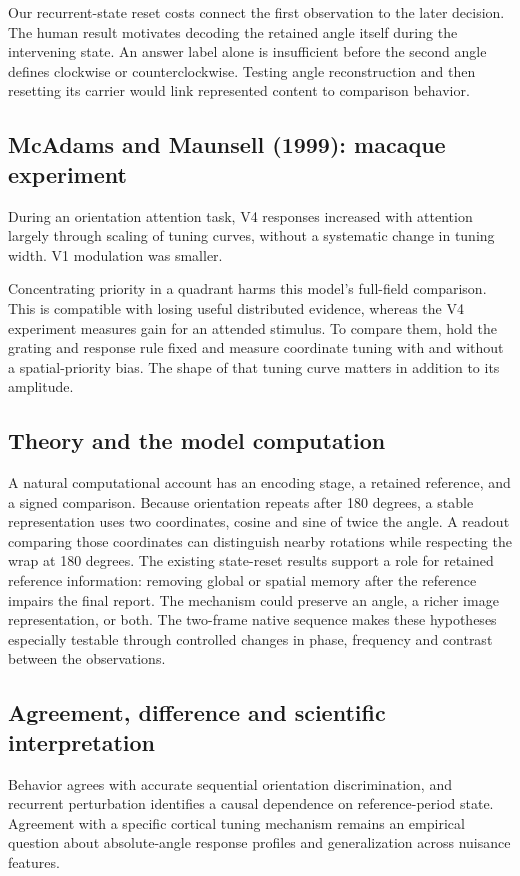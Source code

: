 \documentclass[11pt]{article}
\begin{document}
Our recurrent-state reset costs connect the first observation to the later decision. The human result motivates decoding the retained angle itself during the intervening state. An answer label alone is insufficient before the second angle defines clockwise or counterclockwise. Testing angle reconstruction and then resetting its carrier would link represented content to comparison behavior.

\subsection{McAdams and Maunsell (1999): macaque experiment}
During an orientation attention task, V4 responses increased with attention largely through scaling of tuning curves, without a systematic change in tuning width. V1 modulation was smaller. \cite{bio_mcadams}

Concentrating priority in a quadrant harms this model’s full-field comparison. This is compatible with losing useful distributed evidence, whereas the V4 experiment measures gain for an attended stimulus. To compare them, hold the grating and response rule fixed and measure coordinate tuning with and without a spatial-priority bias. The shape of that tuning curve matters in addition to its amplitude.

\subsection{Theory and the model computation}
A natural computational account has an encoding stage, a retained reference, and a signed comparison. Because orientation repeats after 180 degrees, a stable representation uses two coordinates, cosine and sine of twice the angle. A readout comparing those coordinates can distinguish nearby rotations while respecting the wrap at 180 degrees. The existing state-reset results support a role for retained reference information: removing global or spatial memory after the reference impairs the final report. The mechanism could preserve an angle, a richer image representation, or both. The two-frame native sequence makes these hypotheses especially testable through controlled changes in phase, frequency and contrast between the observations.

\subsection{Agreement, difference and scientific interpretation}
Behavior agrees with accurate sequential orientation discrimination, and recurrent perturbation identifies a causal dependence on reference-period state. Agreement with a specific cortical tuning mechanism remains an empirical question about absolute-angle response profiles and generalization across nuisance features.
\end{document}
